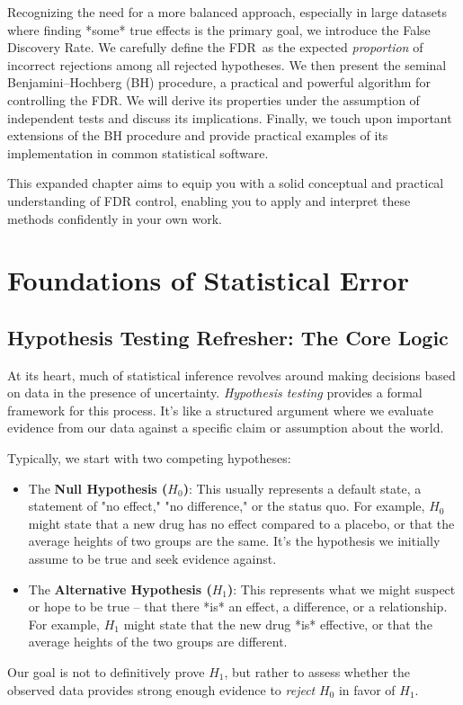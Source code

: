 \documentclass[12pt]{book}
\newcommand{\FDR}{{FDR}}    %
\newcommand{\Hnull}{H_0}                 %
\newcommand{\Halt}{H_1}                  %
\begin{document}
Recognizing the need for a more balanced approach, especially in large datasets where finding *some* true effects is the primary goal, we introduce the False Discovery Rate. We carefully define the \FDR\ as the expected \emph{proportion} of incorrect rejections among all rejected hypotheses. We then present the seminal Benjamini–Hochberg (BH) procedure, a practical and powerful algorithm for controlling the \FDR. We will derive its properties under the assumption of independent tests and discuss its implications. Finally, we touch upon important extensions of the BH procedure and provide practical examples of its implementation in common statistical software.

This expanded chapter aims to equip you with a solid conceptual and practical understanding of FDR control, enabling you to apply and interpret these methods confidently in your own work.

\mainmatter

\chapter{Foundations of Statistical Error}
\label{chap:foundations}

\section{Hypothesis Testing Refresher: The Core Logic}
At its heart, much of statistical inference revolves around making decisions based on data in the presence of uncertainty. \emph{Hypothesis testing} provides a formal framework for this process. It's like a structured argument where we evaluate evidence from our data against a specific claim or assumption about the world.

Typically, we start with two competing hypotheses:
\begin{itemize}
    \item The \textbf{Null Hypothesis ($\Hnull$)}: This usually represents a default state, a statement of "no effect," "no difference," or the status quo. For example, $\Hnull$ might state that a new drug has no effect compared to a placebo, or that the average heights of two groups are the same. It's the hypothesis we initially assume to be true and seek evidence against.
    \item The \textbf{Alternative Hypothesis ($\Halt$)}: This represents what we might suspect or hope to be true – that there *is* an effect, a difference, or a relationship. For example, $\Halt$ might state that the new drug *is* effective, or that the average heights of the two groups are different.
\end{itemize}
Our goal is not to definitively prove $\Halt$, but rather to assess whether the observed data provides strong enough evidence to \emph{reject} $\Hnull$ in favor of $\Halt$.
\end{document}

